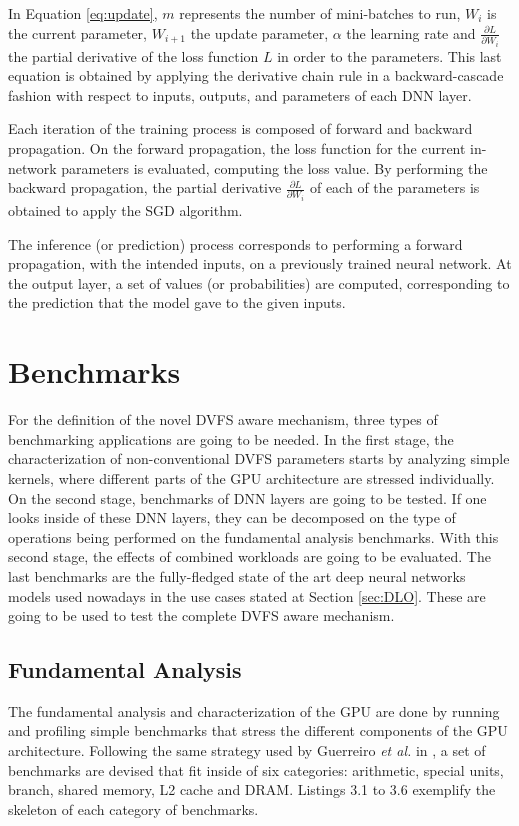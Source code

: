 In Equation \ref{eq:update}, $m$ represents the number of mini-batches to run, $W_i$ is the current parameter, $W_{i+1}$ the update parameter, $\alpha$ the learning rate and $\frac{\partial L}{\partial W_i}$ the partial derivative of the loss function $L$ in order to the parameters. This last equation is obtained by applying the derivative chain rule in a backward-cascade fashion with respect to inputs, outputs, and parameters of each DNN layer.

Each iteration of the training process is composed of forward and backward propagation. On the forward propagation, the loss function for the current in-network parameters is evaluated, computing the loss value. By performing the backward propagation, the partial derivative $\frac{\partial L}{\partial W_i}$ of each of the parameters is obtained to apply the SGD algorithm. 

The inference (or prediction) process corresponds to performing a forward propagation, with the intended inputs, on a previously trained neural network. At the output layer, a set of values (or probabilities) are computed, corresponding to the prediction that the model gave to the given inputs.

\section{Benchmarks}

For the definition of the novel DVFS aware mechanism, three types of benchmarking applications are going to be needed. In the first stage, the characterization of non-conventional DVFS parameters starts by analyzing simple kernels, where different parts of the GPU architecture are stressed individually. 
On the second stage, benchmarks of DNN layers are going to be tested. If one looks inside of these DNN layers, they can be decomposed on the type of operations being performed on the fundamental analysis benchmarks. With this second stage, the effects of combined workloads are going to be evaluated.
The last benchmarks are the fully-fledged state of the art deep neural networks models used nowadays in the use cases stated at Section \ref{sec:DLO}. These are going to be used to test the complete DVFS aware mechanism.

\subsection{Fundamental Analysis}
\label{sec:funAnal}

The fundamental analysis and characterization of the GPU are done by running and profiling simple benchmarks that stress the different components of the GPU architecture. Following the same strategy used by Guerreiro \textit{et al.} in \cite{guerreiro_gpgpu_2018} \cite{guerreiro_modeling_2019}, a set of benchmarks are devised that fit inside of six categories: arithmetic, special units, branch, shared memory, L2 cache and DRAM.  Listings 3.1 to 3.6 exemplify the skeleton of each category of benchmarks.


